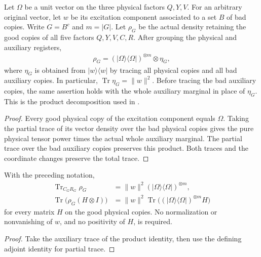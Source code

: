 \begin{theorem}
\label{thm:replica_good_configuration_product}
\leanok
Let $\Omega$ be a unit vector on the three physical factors $Q,Y,V$.
For an arbitrary original vector, let $w$ be its excitation component
associated to a set $B$ of bad copies. Write $G=B^c$ and $m=|G|$.
Let $\rho_G$ be the actual density retaining the good copies of all five
factors $Q,Y,V,C,R$. After grouping the physical and auxiliary registers,
\begin{align*}
 \rho_G=(|\Omega\rangle\langle\Omega|)^{\otimes m}\otimes\eta_G,
\end{align*}
where $\eta_G$ is obtained from $|w\rangle\langle w|$ by tracing all
physical copies and all bad auxiliary copies. In particular,
$\operatorname{Tr}\eta_G=\|w\|^2$.
Before tracing the bad auxiliary copies, the same assertion holds with
the whole auxiliary marginal in place of $\eta_G$.
This is the product decomposition used in
\cite[Section~8, lines~520--560]{OpenAI2026AreaLaw}.
\end{theorem}
\begin{proof}
\leanok
{}
Every good physical copy of the excitation component equals $\Omega$.
Taking the partial trace of its vector density over the bad physical
copies gives the pure physical tensor power times the actual whole
auxiliary marginal. The partial trace over the bad auxiliary copies
preserves this product. Both traces and the coordinate changes preserve
the total trace.
\end{proof}

\begin{theorem}
\label{thm:replica_good_configuration_physical_expectation}
\leanok
With the preceding notation,
\begin{align*}
 \operatorname{Tr}_{C_G R_G}\rho_G
 &=\|w\|^2(|\Omega\rangle\langle\Omega|)^{\otimes m},\\
 \operatorname{Tr}\bigl(\rho_G(H\otimes I)\bigr)
 &=\|w\|^2\operatorname{Tr}\bigl((|\Omega\rangle\langle\Omega|)^{\otimes m}H\bigr)
\end{align*}
for every matrix $H$ on the good physical copies. No normalization or
nonvanishing of $w$, and no positivity of $H$, is required.
\end{theorem}
\begin{proof}
\leanok
{}
Take the auxiliary trace of the product identity, then use the defining
adjoint identity for partial trace.
\end{proof}
